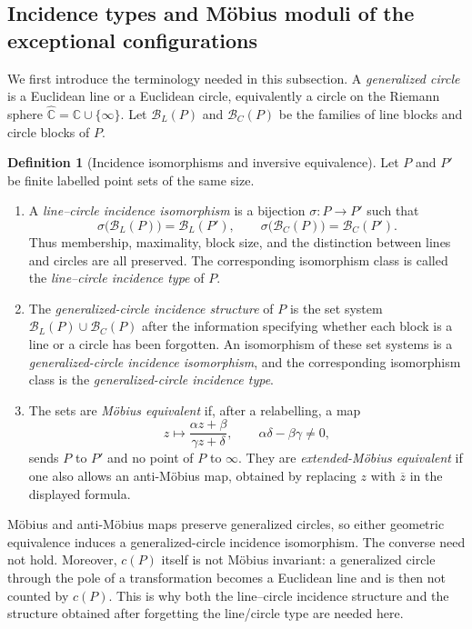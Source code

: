 \documentclass[11pt,a4paper]{article}
\theoremstyle{definition}
\newtheorem{definition}[theorem]{Definition}
\begin{document}
\subsection{Incidence types and Möbius moduli of the exceptional configurations}
\label{sec:exceptional-moduli-en}

We first introduce the terminology needed in this subsection.  A
\emph{generalized circle} is a Euclidean line or a Euclidean circle,
equivalently a circle on the Riemann sphere
$\widehat{\mathbb C}=\mathbb C\cup\{\infty\}$.  Let $\mathcal B_L(P)$ and
$\mathcal B_C(P)$ be the families of line blocks and circle blocks of $P$.

\begin{definition}[Incidence isomorphisms and inversive equivalence]
Let $P$ and $P'$ be finite labelled point sets of the same size.
\begin{enumerate}[label=\textup{(\roman*)}]
\item A \emph{line--circle incidence isomorphism} is a bijection
$\sigma:P\to P'$ such that
\[
 \sigma\bigl(\mathcal B_L(P)\bigr)=\mathcal B_L(P'),\qquad
 \sigma\bigl(\mathcal B_C(P)\bigr)=\mathcal B_C(P').
\]
Thus membership, maximality, block size, and the distinction between lines and
circles are all preserved.  The corresponding isomorphism class is called the
\emph{line--circle incidence type} of $P$.
\item The \emph{generalized-circle incidence structure} of $P$ is the set
system $\mathcal B_L(P)\cup\mathcal B_C(P)$ after the information specifying
whether each block is a line or a circle has been forgotten.  An isomorphism of
these set systems is a \emph{generalized-circle incidence isomorphism}, and the
corresponding isomorphism class is the \emph{generalized-circle incidence type}.
\item The sets are \emph{Möbius equivalent} if, after a relabelling, a map
\[
 z\longmapsto\frac{\alpha z+\beta}{\gamma z+\delta},\qquad
 \alpha\delta-\beta\gamma\ne0,
\]
sends $P$ to $P'$ and no point of $P$ to $\infty$.  They are
\emph{extended-Möbius equivalent} if one also allows an anti-Möbius map,
obtained by replacing $z$ with $\overline z$ in the displayed formula.
\end{enumerate}
\end{definition}

Möbius and anti-Möbius maps preserve generalized circles, so either geometric
equivalence induces a generalized-circle incidence isomorphism.  The converse
need not hold.  Moreover, $c(P)$ itself is not Möbius invariant: a generalized
circle through the pole of a transformation becomes a Euclidean line and is
then not counted by $c(P)$.  This is why both the line--circle incidence
structure and the structure obtained after forgetting the line/circle type are
needed here.
\end{document}
